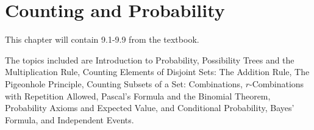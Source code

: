 \documentclass[../discrete.tex]{subfiles}
\begin{document}
\chapter{Counting and Probability}
This chapter will contain 9.1-9.9 from the textbook.

The topics included are Introduction to Probability, Possibility Trees and the Multiplication Rule, Counting Elements of Disjoint Sets: The Addition Rule, The Pigeonhole Principle, Counting Subsets of a Set: Combinations, $r$-Combinations with Repetition Allowed, Pascal's Formula and the Binomial Theorem, Probability Axioms and Expected Value, and Conditional Probability, Bayes' Formula, and Independent Events.
\end{document}
